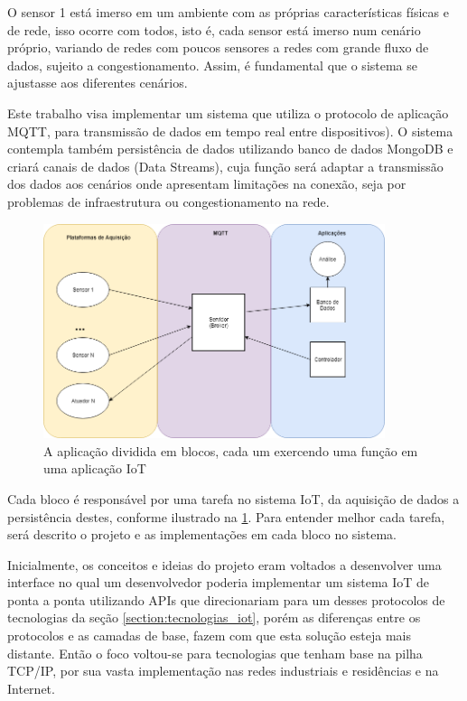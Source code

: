 O sensor 1 está imerso em um ambiente com as próprias características físicas e de rede, isso ocorre com todos, isto é, cada sensor está imerso num cenário próprio, variando de redes com poucos sensores a redes com grande fluxo de dados, sujeito a congestionamento. Assim, é fundamental que o  sistema se ajustasse aos diferentes cenários.

Este trabalho visa implementar um sistema que utiliza o protocolo de aplicação MQTT, para transmissão de dados em tempo real entre dispositivos). O sistema contempla também persistência de dados utilizando banco de dados MongoDB e criará canais de dados (Data Streams), cuja função será adaptar a transmissão dos dados aos cenários onde apresentam limitações na conexão, seja por problemas de infraestrutura ou congestionamento na rede.

\begin{figure}[h!]
\centering
\includegraphics[width=10cm]{./02_Capitulos/02_Cap1/figures/iot_app-layers}
\caption{A aplicação dividida em blocos, cada um exercendo uma função em uma aplicação IoT}
\label{fig:1.1.0/iot_app-layers}
\end{figure}


Cada bloco é responsável por uma tarefa no sistema IoT, da aquisição de dados a persistência destes, conforme ilustrado na \ref{fig:1.1.0/iot_app-layers}. Para entender melhor cada tarefa, será descrito o projeto e as implementações em cada bloco no sistema.

Inicialmente, os conceitos e ideias do projeto eram voltados a desenvolver uma interface no qual um desenvolvedor poderia implementar um sistema IoT de ponta a ponta utilizando APIs que direcionariam para um desses protocolos de tecnologias da seção \ref{section:tecnologias_iot}, porém as diferenças entre os protocolos e as camadas de base, fazem com que esta solução esteja mais distante. Então o foco voltou-se  para tecnologias que tenham base na pilha TCP/IP, por sua vasta implementação nas redes industriais e residências e na Internet.

